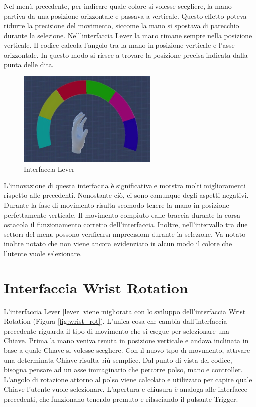 \documentclass[target=bach,aauheader=]{thud}
\begin{document}
Nel menù precedente, per indicare quale colore si volesse scegliere, la mano partiva da una posizione orizzontale e passava a verticale.
Questo effetto poteva ridurre la precisione del movimento, siccome la mano si spostava di parecchio durante la selezione.
Nell'interfaccia Lever la mano rimane sempre nella posizione verticale.
Il codice calcola l'angolo tra la mano in posizione verticale e l'asse orizzontale.
In questo modo si riesce a trovare la posizione precisa indicata dalla punta delle dita.
 
\begin{figure}[h]
    \centering
    \includegraphics[width=0.60\textwidth]{lever}
    \caption{Interfaccia Lever}
    \label{fig:lever}
\end{figure}

L'innovazione di questa interfaccia è significativa e motstra molti miglioramenti rispetto alle precedenti.
Nonostante ciò, ci sono comunque degli aspetti negativi.
Durante la fase di movimento risulta scomodo tenere la mano in posizione perfettamente verticale.
Il movimento compiuto dalle braccia durante la corsa ostacola il funzionamento corretto dell'interfaccia.
Inoltre, nell'intervallo tra due settori del menu possono verificarsi imprecisioni durante la selezione.
Va notato inoltre notato che non viene ancora evidenziato in alcun modo il colore che l'utente vuole selezionare. 

\section{Interfaccia Wrist Rotation} %
\label{wrist_rot}
L'interfaccia Lever \ref{lever} viene migliorata con lo sviluppo dell'interfaccia Wrist Rotation (Figura \ref{fig:wrist_rot}).
L'unica cosa che cambia dall'interfaccia precedente riguarda il tipo di movimento che si esegue per selezionare una Chiave.
Prima la mano veniva tenuta in posizione verticale e andava inclinata in base a quale Chiave si volesse scegliere.
Con il nuovo tipo di movimento, attivare una determinata Chiave risulta più semplice.
Dal punto di vista del codice, bisogna pensare ad un asse immaginario che percorre polso, mano e controller.
L'angolo di rotazione attorno al polso viene calcolato e utilizzato per capire quale Chiave l'utente vuole selezionare.
L'apertura e chiusura è analoga alle interfacce precedenti, che funzionano tenendo premuto e rilasciando il pulsante Trigger. \\
\end{document}
